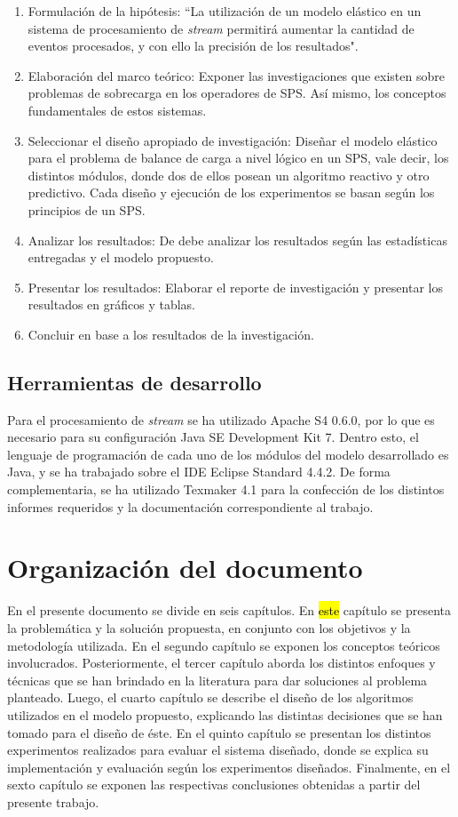 \begin{enumerate}
	\item Formulación de la hipótesis: ``La utilización de un modelo elástico en un sistema de procesamiento de \textit{stream} permitirá aumentar la cantidad de eventos procesados, y con ello la precisión de los resultados".
	\item Elaboración del marco teórico: Exponer las investigaciones que existen sobre problemas de sobrecarga en los operadores de SPS. Así mismo, los conceptos fundamentales de estos sistemas.
	\item Seleccionar el diseño apropiado de investigación: Diseñar el modelo elástico para el problema de balance de carga a nivel lógico en un SPS, vale decir, los distintos módulos, donde dos de ellos posean un algoritmo reactivo y otro predictivo. Cada diseño y ejecución de los experimentos se basan según los principios de un SPS.
	\item Analizar los resultados: De debe analizar los resultados según las estadísticas entregadas y el modelo propuesto.
	\item Presentar los resultados: Elaborar el reporte de investigación y presentar los resultados en gráficos y tablas.
	\item Concluir en base a los resultados de la investigación.
\end{enumerate}

\subsection{Herramientas de desarrollo}
Para el procesamiento de \textit{stream} se ha utilizado Apache S4 0.6.0, por lo que es necesario para su configuración Java SE Development Kit 7. Dentro esto, el lenguaje de programación de cada uno de los módulos del modelo desarrollado es Java, y se ha trabajado sobre el IDE Eclipse Standard 4.4.2. De forma complementaria, se ha utilizado Texmaker 4.1 para la confección de los distintos informes requeridos y la documentación correspondiente al trabajo.

\section{Organización del documento}
\label{intro:organizacion}
En el presente documento se divide en seis capítulos. En \hl{este} capítulo se presenta la problemática y la solución propuesta, en conjunto con los objetivos y la metodología utilizada. En el segundo capítulo se exponen los conceptos teóricos involucrados. Posteriormente, el tercer capítulo aborda los distintos enfoques y técnicas que se han brindado en la literatura para dar soluciones al problema planteado. Luego, el cuarto capítulo se describe el diseño de los algoritmos utilizados en el modelo propuesto, explicando las distintas decisiones que se han tomado para el diseño de éste. En el quinto capítulo se presentan los distintos experimentos realizados para evaluar el sistema diseñado, donde se explica su implementación y evaluación según los experimentos diseñados. Finalmente, en el sexto capítulo se exponen las respectivas conclusiones obtenidas a partir del presente trabajo.